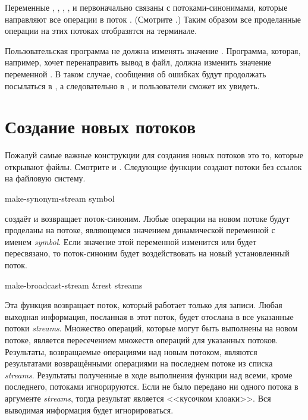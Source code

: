 Переменные , ,
,
,
 и 
первоначально связаны с потоками-синонимами, которые направляют все операции в
поток .
(Смотрите .)
Таким образом все проделанные операции на этих потоках отобразятся на терминале.

Пользовательская программа не должна изменять значение
. Программа, которая, например, хочет перенаправить вывод в файл,
должна изменить значение переменной . В таком случае,
сообщения об ошибках будут продолжать посылаться в , а
следовательно в , и пользователи сможет их увидеть.

\section {Создание новых потоков}

Пожалуй самые важные конструкции для создания новых потоков это то, которые
открывают файлы. Смотрите  и .
Следующие функции создают потоки без ссылок на файловую систему.

\begin{defun}[Функция]
make-synonym-stream symbol

 создаёт и возвращает поток-синоним.
Любые операции на новом потоке будут проделаны на потоке, являющемся значением
динамической переменной с именем \emph{symbol}.
Если значение этой переменной изменится или будет пересвязано, то поток-синоним
будет воздействовать на новый установленный поток.
\end{defun}

\begin{defun}[Функция]
make-broadcast-stream &rest streams

Эта функция возвращает поток, который работает только для записи. Любая выходная
информация, посланная в этот поток, будет отослана в все указанные потоки
\emph{streams}.
Множество операций, которые могут быть выполнены на новом потоке, является
пересечением множеств операций для указанных потоков. Результаты, возвращаемые
операциями над новым потоком, являются результатами возвращёнными операциями на
последнем потоке из списка \emph{streams}.
Результаты полученные в ходе выполнения функции над всеми, кроме последнего,
потоками игнорируются.
Если не было передано ни одного потока в аргументе \emph{streams}, тогда
результат является <<кусочком клоаки>>. Вся выводимая информация будет
игнорироваться.
\end{defun}

